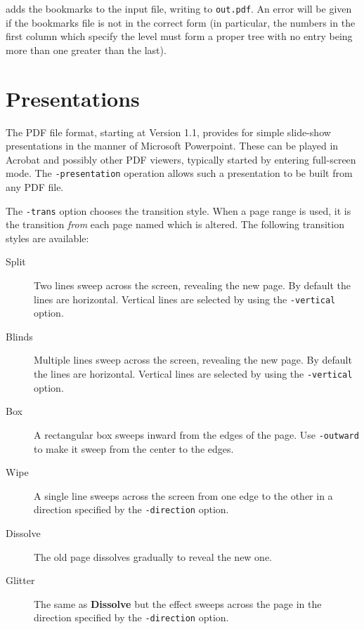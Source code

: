 \documentclass{book}
\begin{document}
\noindent adds the bookmarks to the input file, writing to \texttt{out.pdf}. An error
will be given if the bookmarks file is not in the correct form (in particular,
the numbers in the first column which specify the level must form a proper
tree with no entry being more than one greater than the last).

\chapter{Presentations}

\noindent{}


  \vspace{12mm}
The PDF file format, starting at Version 1.1, provides for simple slide-show
presentations in the manner of Microsoft Powerpoint. These can be played in
Acrobat and possibly other PDF viewers, typically started by entering
full-screen mode. The \texttt{-presentation} operation allows such a
presentation to be built from any PDF file.

The \texttt{-trans} option chooses the transition style. When a page range is
used, it is the transition \textit{from} each page named which is altered. The
following transition styles are available:

\begin{description}
  \item[Split]Two lines sweep across the screen, revealing the new page. By
default the lines are horizontal. Vertical lines are selected by using the
\texttt{-vertical} option.
  \item[Blinds]Multiple lines sweep across the screen, revealing the new page.
By default the lines are horizontal. Vertical lines are selected by using the
\texttt{-vertical} option.
  \item[Box]A rectangular box sweeps inward from the edges of the page. Use
\texttt{-outward} to make it sweep from the center to the edges.
  \item[Wipe]A single line sweeps across the screen from one edge to the other
in a direction specified by the \texttt{-direction} option.
  \item[Dissolve]The old page dissolves gradually to reveal the new one.
  \item[Glitter]The same as \textbf{Dissolve} but the effect sweeps across the
page in the direction specified by the \texttt{-direction} option.
\end{description}
\end{document}
